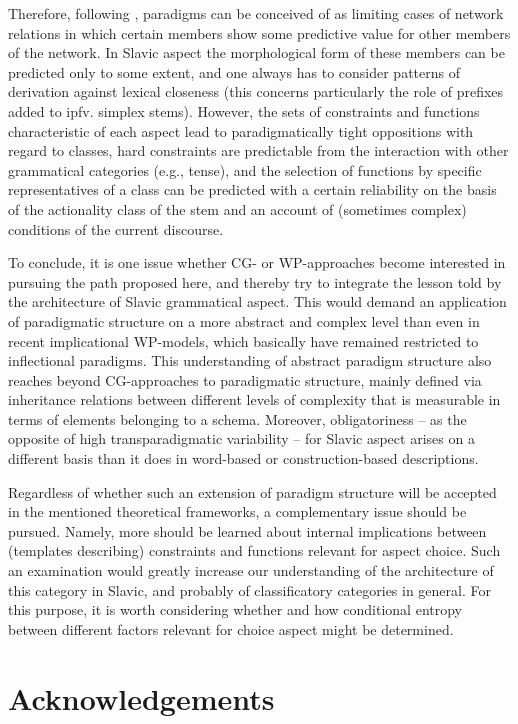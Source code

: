 \documentclass[output=paper]{langscibook}
\begin{document}
Therefore, following \citet{Blevins2016}, paradigms can be conceived of as limiting cases of network relations in which certain members show some predictive value for other members of the network. In Slavic aspect the morphological form of these members can be predicted only to some extent, and one always has to consider patterns of derivation against lexical closeness (this concerns particularly the role of prefixes added to ipfv. simplex stems). However, the sets of constraints and functions characteristic of each aspect lead to paradigmatically tight oppositions with regard to classes, hard constraints are predictable from the interaction with other grammatical categories (e.g., tense), and the selection of functions by specific representatives of a class can be predicted with a certain reliability on the basis of the actionality class of the stem and an account of (sometimes complex) conditions of the current discourse.

To conclude, it is one issue whether CG- or WP-approaches become interested in pursuing the path proposed here, and thereby try to integrate the lesson told by the architecture of Slavic grammatical aspect. This would demand an application of paradigmatic structure on a more abstract and complex level than even in recent implicational WP-models, which basically have remained restricted to inflectional paradigms. This understanding of abstract paradigm structure also reaches beyond CG-approaches to paradigmatic structure, mainly defined via inheritance relations between different levels of complexity that is measurable in terms of elements belonging to a schema. Moreover, obligatoriness – as the opposite of high transparadigmatic variability – for Slavic aspect arises on a different basis than it does in word-based or construction-based descriptions.

Regardless of whether such an extension of paradigm structure will be accepted in the mentioned theoretical frameworks, a complementary issue should be pursued. Namely, more should be learned about internal implications between (templates describing) constraints and functions relevant for aspect choice. Such an examination would greatly increase our understanding of the architecture of this category in Slavic, and probably of classificatory categories in general. For this purpose, it is worth considering whether and how conditional entropy between different factors relevant for choice aspect might be determined.

\section*{Acknowledgements}
\end{document}
